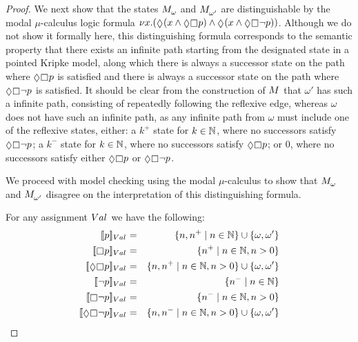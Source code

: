 \begin{proof}
We next show that the states $\kPModel{\omega}$ and $\kPModel{\omega'}$ are distinguishable by the modal $\mu$-calculus logic formula $\gfp{\varX} (\possible (\varX \land \possible \necessary \atomP) \land \possible (\varX \land \possible \necessary \neg \atomP))$.
Although we do not show it formally here, this distinguishing formula corresponds to the semantic property that there exists an infinite path starting from the designated state in a pointed Kripke model, along which there is always a successor state on the path where $\possible \necessary \atomP$ is satisfied and there is always a successor state on the path where $\possible \necessary \lnot \atomP$ is satisfied.
It should be clear from the construction of $\kModel$ that $\omega'$ has such a infinite path, consisting of repeatedly following the reflexive edge, whereas $\omega$ does not have such an infinite path, as any infinite path from $\omega$ must include one of the reflexive states, either: a $k^+$ state for $k \in \mathbb{N}$, where no successors satisfy $\possible \necessary \lnot \atomP$; a $k^-$ state for $k \in \mathbb{N}$, where no successors satisfy $\possible \necessary \atomP$; or $0$, where no successors satisfy either $\possible \necessary \atomP$ or $\possible \necessary \lnot \atomP$.

We proceed with model checking using the modal $\mu$-calculus to show that $\kPModel{\omega}$ and $\kPModel{\omega'}$ disagree on the interpretation of this distinguishing formula.

For any assignment $\kAssignment$ we have the following:
\begin{eqnarray*}
    \interpretation[\kAssignment]{\atomP} &=& \{n, n^+ \mid n \in \naturals\} \cup \{\omega, \omega'\}\\
    \interpretation[\kAssignment]{\necessary \atomP} &=& \{n^+ \mid n \in \naturals, n > 0\}\\
    \interpretation[\kAssignment]{\possible \necessary \atomP} &=& \{n, n^+ \mid n \in \naturals, n > 0\} \cup \{\omega, \omega'\}\\
    \interpretation[\kAssignment]{\neg \atomP} &=& \{n^- \mid n \in \naturals\}\\
    \interpretation[\kAssignment]{\necessary \neg \atomP} &=& \{n^- \mid n \in \naturals, n > 0\}\\
    \interpretation[\kAssignment]{\possible \necessary \neg \atomP} &=& \{n, n^- \mid n \in \naturals, n > 0\} \cup \{\omega, \omega'\}
\end{eqnarray*}


\end{proof}
